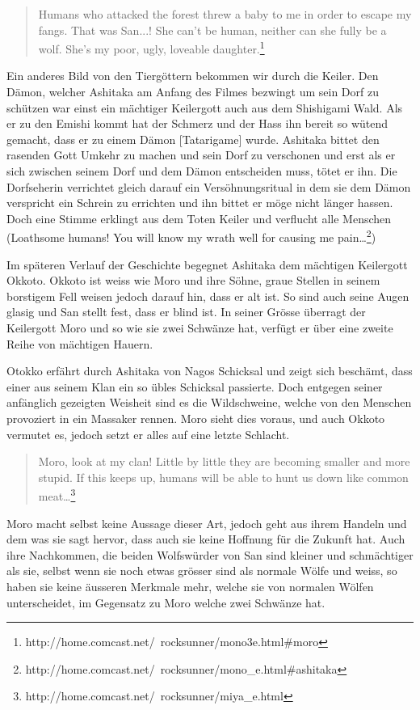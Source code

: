 \begin{quote}
Humans who attacked the forest threw a baby to me in order to escape my fangs. That was San...! She can't be human, neither can she fully be a wolf. She's my poor, ugly, loveable daughter.\footnote{http://home.comcast.net/~rocksunner/mono3e.html\#moro}
\end{quote}

Ein anderes Bild von den Tiergöttern bekommen wir durch die Keiler. Den Dämon, welcher Ashitaka am Anfang des Filmes bezwingt um sein Dorf zu schützen war einst ein mächtiger Keilergott auch aus dem Shishigami Wald. Als er zu den Emishi kommt hat der Schmerz und der Hass ihn bereit so wütend gemacht, dass er zu einem Dämon [Tatarigame] wurde. Ashitaka bittet den rasenden Gott Umkehr zu machen und sein Dorf zu verschonen und erst als er sich zwischen seinem Dorf und dem Dämon entscheiden muss, tötet er ihn. Die Dorfseherin verrichtet gleich darauf ein Versöhnungsritual in dem sie dem Dämon verspricht ein Schrein zu errichten und ihn bittet er möge nicht länger hassen. Doch eine Stimme erklingt aus dem Toten Keiler und verflucht alle Menschen (\glqq  Loathsome humans! You will know my wrath well for causing me pain\dots \grqq \footnote{http://home.comcast.net/~rocksunner/mono\_e.html\#ashitaka})

Im späteren Verlauf der Geschichte begegnet Ashitaka dem mächtigen Keilergott Okkoto. Okkoto ist weiss wie Moro und ihre Söhne, graue Stellen in seinem borstigem Fell weisen jedoch darauf hin, dass er alt ist. So sind auch seine Augen glasig und San stellt fest, dass er blind ist. In seiner Grösse überragt der Keilergott Moro und so wie sie zwei Schwänze hat, verfügt er über eine zweite Reihe von mächtigen Hauern. 

Otokko erfährt durch Ashitaka von Nagos Schicksal und zeigt sich beschämt, dass einer aus seinem Klan ein so übles Schicksal passierte. Doch entgegen seiner anfänglich gezeigten Weisheit sind es die Wildschweine, welche von den Menschen provoziert in ein Massaker rennen. Moro sieht dies voraus, und auch Okkoto vermutet es, jedoch setzt er alles auf eine letzte Schlacht. 

\begin{quote}
Moro, look at my clan! Little by little they are becoming smaller and more stupid. If this keeps up, humans will be able to hunt us down like common meat\dots \footnote{http://home.comcast.net/~rocksunner/miya\_e.html} 
\end{quote}

Moro macht selbst keine Aussage dieser Art, jedoch geht aus ihrem Handeln und dem was sie sagt hervor, dass auch sie keine Hoffnung für die Zukunft hat. Auch ihre Nachkommen, die beiden Wolfswürder von San sind kleiner und schmächtiger als sie, selbst wenn sie noch etwas grösser sind als normale Wölfe und weiss, so haben sie keine äusseren Merkmale mehr, welche sie von normalen Wölfen unterscheidet, im Gegensatz zu Moro welche zwei Schwänze hat.

